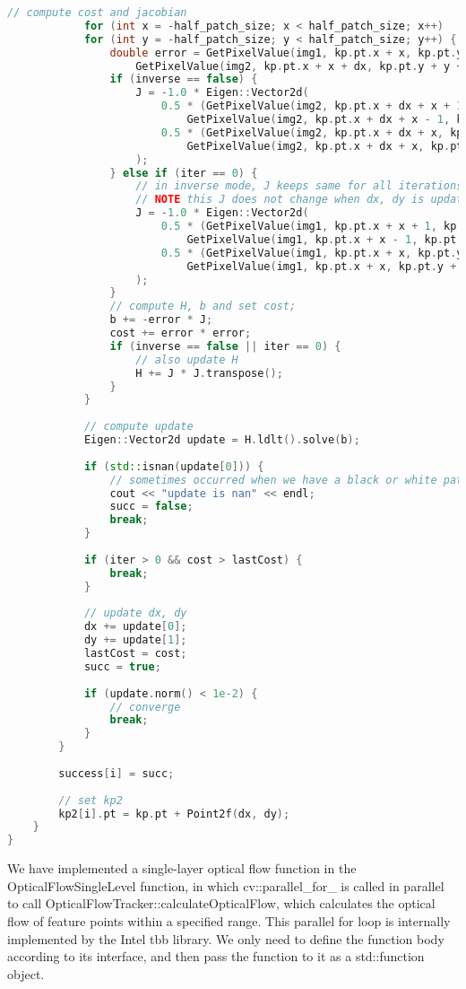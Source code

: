 \begin{lstlisting}[language=c++,caption=slambook2/ch8/optical_flow.cpp (snippet))]
			// compute cost and jacobian
			for (int x = -half_patch_size; x < half_patch_size; x++)
			for (int y = -half_patch_size; y < half_patch_size; y++) {
				double error = GetPixelValue(img1, kp.pt.x + x, kp.pt.y + y) -
					GetPixelValue(img2, kp.pt.x + x + dx, kp.pt.y + y + dy);;  // Jacobian
				if (inverse == false) {
					J = -1.0 * Eigen::Vector2d(
						0.5 * (GetPixelValue(img2, kp.pt.x + dx + x + 1, kp.pt.y + dy + y) -
							GetPixelValue(img2, kp.pt.x + dx + x - 1, kp.pt.y + dy + y)),
						0.5 * (GetPixelValue(img2, kp.pt.x + dx + x, kp.pt.y + dy + y + 1) -
							GetPixelValue(img2, kp.pt.x + dx + x, kp.pt.y + dy + y - 1))
					);
				} else if (iter == 0) {
					// in inverse mode, J keeps same for all iterations
					// NOTE this J does not change when dx, dy is updated, so we can store it and only compute error
					J = -1.0 * Eigen::Vector2d(
						0.5 * (GetPixelValue(img1, kp.pt.x + x + 1, kp.pt.y + y) -
							GetPixelValue(img1, kp.pt.x + x - 1, kp.pt.y + y)),
						0.5 * (GetPixelValue(img1, kp.pt.x + x, kp.pt.y + y + 1) -
							GetPixelValue(img1, kp.pt.x + x, kp.pt.y + y - 1))
					);
				}
				// compute H, b and set cost;
				b += -error * J;
				cost += error * error;
				if (inverse == false || iter == 0) {
					// also update H
					H += J * J.transpose();
				}
			}
			
			// compute update
			Eigen::Vector2d update = H.ldlt().solve(b);
			
			if (std::isnan(update[0])) {
				// sometimes occurred when we have a black or white patch and H is irreversible
				cout << "update is nan" << endl;
				succ = false;
				break;
			}
			
			if (iter > 0 && cost > lastCost) {
				break;
			}
			
			// update dx, dy
			dx += update[0];
			dy += update[1];
			lastCost = cost;
			succ = true;
			
			if (update.norm() < 1e-2) {
				// converge
				break;
			}
		}
		
		success[i] = succ;
		
		// set kp2
		kp2[i].pt = kp.pt + Point2f(dx, dy);
	}
}
\end{lstlisting}

We have implemented a single-layer optical flow function in the OpticalFlowSingleLevel function, in which cv::parallel\_for\_ is called in parallel to call OpticalFlowTracker::calculateOpticalFlow, which calculates the optical flow of feature points within a specified range. This parallel for loop is internally implemented by the Intel tbb library. We only need to define the function body according to its interface, and then pass the function to it as a std::function object.


